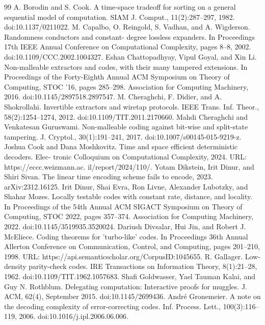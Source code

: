 \documentclass[10pt,a4paper]{article}
\begin{document}
\begin{thebibliography}{99}
 A. Borodin and S. Cook. A time-space tradeoff for sorting on a general sequential model of computation. SIAM J. Comput., 11(2):287–297, 1982. doi:10.1137/0211022.
 M. Capalbo, O. Reingold, S. Vadhan, and A. Wigderson. Randomness conductors and constant- degree lossless expanders. In Proceedings 17th IEEE Annual Conference on Computational Complexity, pages 8–8, 2002. doi:10.1109/CCC.2002.1004327.
 Eshan Chattopadhyay, Vipul Goyal, and Xin Li. Non-malleable extractors and codes, with their many tampered extensions. In Proceedings of the Forty-Eighth Annual ACM Symposium on Theory of Computing, STOC ’16, pages 285–298. Association for Computing Machinery, 2016. doi:10.1145/2897518.2897547.
 M. Cheraghchi, F. Didier, and A. Shokrollahi. Invertible extractors and wiretap protocols. IEEE Trans. Inf. Theor., 58(2):1254–1274, 2012. doi:10.1109/TIT.2011.2170660.
 Mahdi Cheraghchi and Venkatesan Guruswami. Non-malleable coding against bit-wise and split-state tampering. J. Cryptol., 30(1):191–241, 2017. doi:10.1007/s00145-015-9219-z.
 Joshua Cook and Dana Moshkovitz. Time and space efficient deterministic decoders. Elec- tronic Colloquium on Computational Complexity, 2024. URL: https://eccc.weizmann.ac. il/report/2024/110/.
 Yotam Dikstein, Irit Dinur, and Shiri Sivan. The linear time encoding scheme fails to encode, 2023. arXiv:2312.16125.
 Irit Dinur, Shai Evra, Ron Livne, Alexander Lubotzky, and Shahar Mozes. Locally testable codes with constant rate, distance, and locality. In Proceedings of the 54th Annual ACM SIGACT Symposium on Theory of Computing, STOC 2022, pages 357–374. Association for Computing Machinery, 2022. doi:10.1145/3519935.3520024.
 Dariush Divsalar, Hui Jin, and Robert J. McEliece. Coding theorems for ’turbo-like’ codes. In Proceedings 36th Annual Allerton Conference on Communication, Control, and Computing, pages 201–210, 1998. URL: https://api.semanticscholar.org/CorpusID:1045655.
 R. Gallager. Low-density parity-check codes. IRE Transactions on Information Theory, 8(1):21–28, 1962. doi:10.1109/TIT.1962.1057683.
 Shafi Goldwasser, Yael Tauman Kalai, and Guy N. Rothblum. Delegating computation: Interactive proofs for muggles. J. ACM, 62(4), September 2015. doi:10.1145/2699436.
 André Gronemeier. A note on the decoding complexity of error-correcting codes. Inf. Process. Lett., 100(3):116–119, 2006. doi:10.1016/j.ipl.2006.06.006.

\end{thebibliography}
\end{document}
